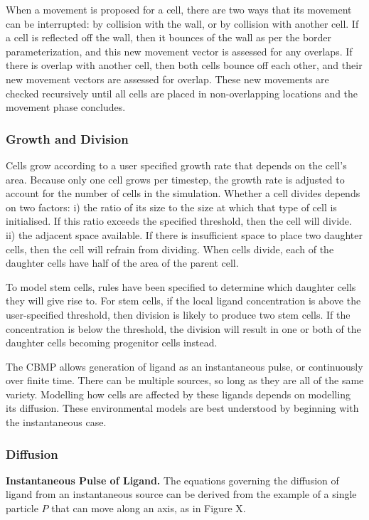 \documentclass[12pt]{article}
\begin{document}
When a movement is proposed for a cell, there are two ways that its 
movement can be interrupted: by collision with the wall, or by collision 
with another cell. If a cell is reflected off the wall, then it bounces 
of the wall as per the border parameterization, and this new movement 
vector is assessed for any overlaps. If there is overlap with another 
cell, then both cells bounce off each other, and their new movement 
vectors are assessed for overlap. These new movements are checked 
recursively until all cells are placed in non-overlapping locations and 
the movement phase concludes.

\subsubsection{Growth and Division}
Cells grow according to a user specified growth rate that depends on the 
cell's area. Because only one cell grows per timestep, the growth rate 
is adjusted to account for the number of cells in the simulation. 
Whether a cell divides depends on two factors: i) the ratio of its size 
to the size at which that type of cell is initialised. If this ratio 
exceeds the specified threshold, then the cell will divide. ii) the 
adjacent space available. If there is insufficient space to place two 
daughter cells, then the cell will refrain from dividing. When cells 
divide, each of the daughter cells have half of the area of the parent 
cell. 

To model stem cells, rules have been specified to determine which 
daughter cells they will give rise to. For stem cells, if the local 
ligand concentration is above the user-specified threshold, then 
division is likely to produce two stem cells. If the concentration is 
below the threshold, the division will result in one or both of the 
daughter cells becoming progenitor cells instead.

The CBMP allows generation of ligand as an instantaneous pulse, or 
continuously over finite time. There can be multiple sources, so long as 
they are all of the same variety. Modelling how cells are affected by 
these ligands depends on modelling its diffusion. These environmental 
models are best understood by beginning with the instantaneous case.

\subsubsection{Diffusion}
{\bfseries Instantaneous Pulse of Ligand.}
The equations governing the diffusion of ligand from an instantaneous 
source can be derived from the example of a single particle \(P\) that can 
move along an axis, as in Figure X.
\end{document}
